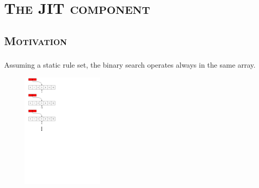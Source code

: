 \documentclass[xcolor=x11names,compress]{beamer}
\renewcommand{\(}{\begin{columns}}
\renewcommand{\)}{\end{columns}}
\newcommand{\<}[1]{\begin{column}{#1}}
\renewcommand{\>}{\end{column}}
\begin{document}

\section{\scshape The JIT component}
\begin{frame}
  \centering\Huge{\insertsection}
\end{frame}

\subsection{\scshape Motivation}
\begin{frame}
  \frametitle{\insertsubsection}
  Assuming a static rule set, the binary search operates always in the same array.\\
  \begin{figure}
  \centering
  \includegraphics[height=5.5cm]{figures/matching_process}
  \end{figure}
\end{frame}
\end{document}

